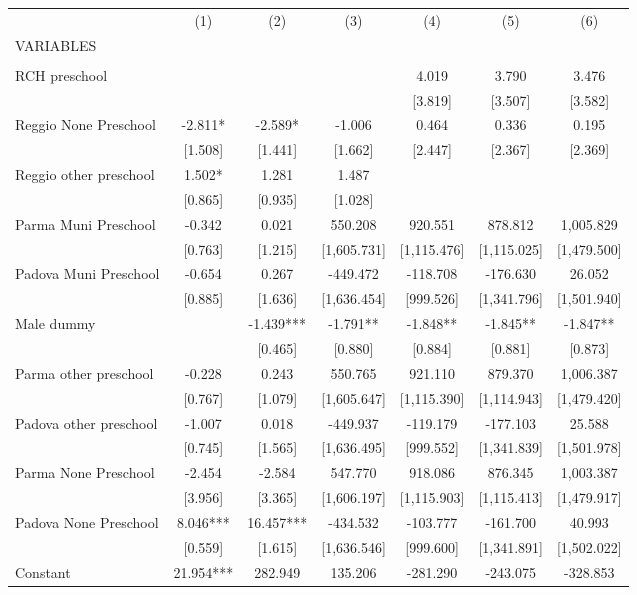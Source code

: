 \begin{tabular}{lcccccc} \hline
 & (1) & (2) & (3) & (4) & (5) & (6) \\
VARIABLES &  &  &  &  &  &  \\ \hline
 &  &  &  &  &  &  \\
RCH preschool &  &  &  & 4.019 & 3.790 & 3.476 \\
 &  &  &  & [3.819] & [3.507] & [3.582] \\
Reggio None Preschool & -2.811* & -2.589* & -1.006 & 0.464 & 0.336 & 0.195 \\
 & [1.508] & [1.441] & [1.662] & [2.447] & [2.367] & [2.369] \\
Reggio other preschool & 1.502* & 1.281 & 1.487 &  &  &  \\
 & [0.865] & [0.935] & [1.028] &  &  &  \\
Parma Muni Preschool & -0.342 & 0.021 & 550.208 & 920.551 & 878.812 & 1,005.829 \\
 & [0.763] & [1.215] & [1,605.731] & [1,115.476] & [1,115.025] & [1,479.500] \\
Padova Muni Preschool & -0.654 & 0.267 & -449.472 & -118.708 & -176.630 & 26.052 \\
 & [0.885] & [1.636] & [1,636.454] & [999.526] & [1,341.796] & [1,501.940] \\
Male dummy &  & -1.439*** & -1.791** & -1.848** & -1.845** & -1.847** \\
 &  & [0.465] & [0.880] & [0.884] & [0.881] & [0.873] \\
Parma other preschool & -0.228 & 0.243 & 550.765 & 921.110 & 879.370 & 1,006.387 \\
 & [0.767] & [1.079] & [1,605.647] & [1,115.390] & [1,114.943] & [1,479.420] \\
Padova other preschool & -1.007 & 0.018 & -449.937 & -119.179 & -177.103 & 25.588 \\
 & [0.745] & [1.565] & [1,636.495] & [999.552] & [1,341.839] & [1,501.978] \\
Parma None Preschool & -2.454 & -2.584 & 547.770 & 918.086 & 876.345 & 1,003.387 \\
 & [3.956] & [3.365] & [1,606.197] & [1,115.903] & [1,115.413] & [1,479.917] \\
Padova None Preschool & 8.046*** & 16.457*** & -434.532 & -103.777 & -161.700 & 40.993 \\
 & [0.559] & [1.615] & [1,636.546] & [999.600] & [1,341.891] & [1,502.022] \\
Constant & 21.954*** & 282.949 & 135.206 & -281.290 & -243.075 & -328.853 \\

\end{tabular}
